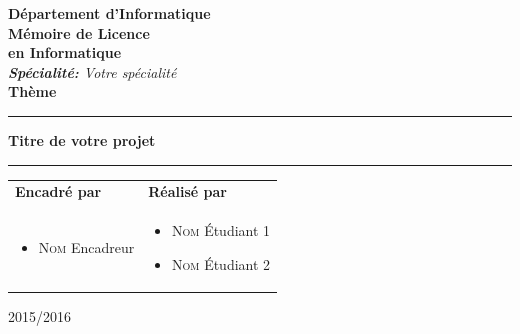 \begin{titlepage}
\begin{center}
{ \textbf{D\'epartement d'Informatique}}\\ \vspace{0.8cm}
\Huge{\textbf{Mémoire de Licence}} \\ \Large{\textbf{en Informatique}} \\\vspace{0.3cm}
\large{\emph{\textbf{Spécialité:} Votre spécialité}}\\ \vspace{0.8cm}
\huge{\textbf{Thème}}\\ %
\noindent\rule{\textwidth}{1mm}
\Large{\textbf{Titre de votre projet}}
\noindent\rule{\textwidth}{1mm}
\end{center}
\vspace{0.3cm}
\begin{tabular}{ p{9cm}  p{6cm} }
\textbf{Encadré par} & \textbf{Réalisé par} \\
\begin{itemize}
	\item \textsc{Nom} Encadreur
\end{itemize}
&
\begin{itemize}
	\item \textsc{Nom} Étudiant 1
	\item \textsc{Nom} Étudiant 2
\end{itemize}
\\
\end{tabular}
\vspace{4.5cm}
\begin{center}
2015/2016
\end{center}

\end{titlepage}